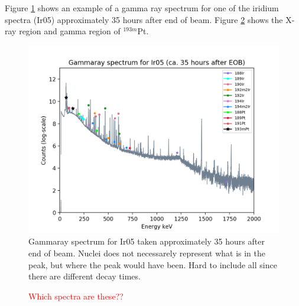 \documentclass[a4paper,11pt,twoside]{book}
\begin{document}
Figure \ref{fig:gammarayspectrum_example} shows an example of a gamma ray spectrum for one of the iridium spectra (Ir05) approximately 35 hours after end of beam. Figure \ref{fig:193mPt_spectra} shows the X-ray region and gamma region of $^{193m}$Pt. 
\begin{figure}
    \centering
    \includegraphics{Analysis/gammaray_spec_Ir05.png}
    \caption{Gammaray spectrum for Ir05 taken approximately 35 hours after end of beam. Nuclei does not necessarely represent what is in the peak, but where the peak would have been. Hard to include all since there are different decay times. }
    \label{fig:gammarayspectrum_example}
\end{figure}


\begin{figure}%
    \centering
    \quad
    \caption{\textcolor{red}{Which spectra are these??  }}%
    \label{fig:193mPt_spectra}%
\end{figure}
\end{document}

